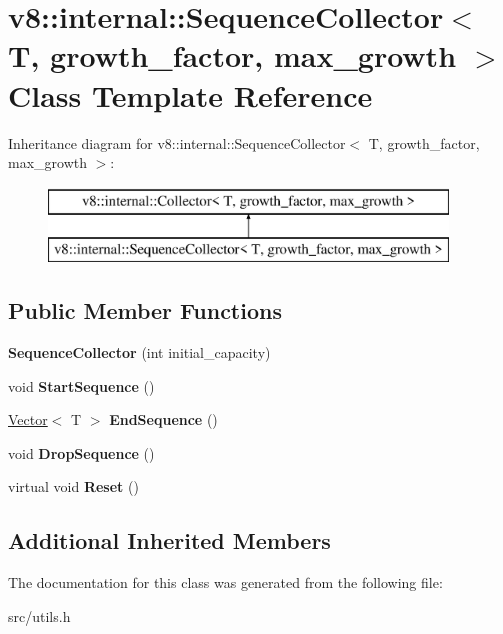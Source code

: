 \hypertarget{classv8_1_1internal_1_1_sequence_collector}{}\section{v8\+:\+:internal\+:\+:Sequence\+Collector$<$ T, growth\+\_\+factor, max\+\_\+growth $>$ Class Template Reference}
\label{classv8_1_1internal_1_1_sequence_collector}
Inheritance diagram for v8\+:\+:internal\+:\+:Sequence\+Collector$<$ T, growth\+\_\+factor, max\+\_\+growth $>$\+:\begin{figure}[H]
\begin{center}
\leavevmode
\includegraphics[height=2.000000cm]{classv8_1_1internal_1_1_sequence_collector}
\end{center}
\end{figure}
\subsection*{Public Member Functions}
\begin{DoxyCompactItemize}
\item 
\hypertarget{classv8_1_1internal_1_1_sequence_collector_aacd053b98186d77b14e4dfc40579d43c}{}{\bfseries Sequence\+Collector} (int initial\+\_\+capacity)\label{classv8_1_1internal_1_1_sequence_collector_aacd053b98186d77b14e4dfc40579d43c}

\item 
\hypertarget{classv8_1_1internal_1_1_sequence_collector_a880a4b89cafb1ebb207002eed168fd03}{}void {\bfseries Start\+Sequence} ()\label{classv8_1_1internal_1_1_sequence_collector_a880a4b89cafb1ebb207002eed168fd03}

\item 
\hypertarget{classv8_1_1internal_1_1_sequence_collector_a9f9ca468a39096e8d4db2ea4f8c9752b}{}\hyperlink{classv8_1_1internal_1_1_vector}{Vector}$<$ T $>$ {\bfseries End\+Sequence} ()\label{classv8_1_1internal_1_1_sequence_collector_a9f9ca468a39096e8d4db2ea4f8c9752b}

\item 
\hypertarget{classv8_1_1internal_1_1_sequence_collector_a1463c63b307d6d9a5633425b72a7a058}{}void {\bfseries Drop\+Sequence} ()\label{classv8_1_1internal_1_1_sequence_collector_a1463c63b307d6d9a5633425b72a7a058}

\item 
\hypertarget{classv8_1_1internal_1_1_sequence_collector_a7474c0128d73ccc822f14f0ebb9a39f8}{}virtual void {\bfseries Reset} ()\label{classv8_1_1internal_1_1_sequence_collector_a7474c0128d73ccc822f14f0ebb9a39f8}

\end{DoxyCompactItemize}
\subsection*{Additional Inherited Members}


The documentation for this class was generated from the following file\+:\begin{DoxyCompactItemize}
\item 
src/utils.\+h\end{DoxyCompactItemize}
